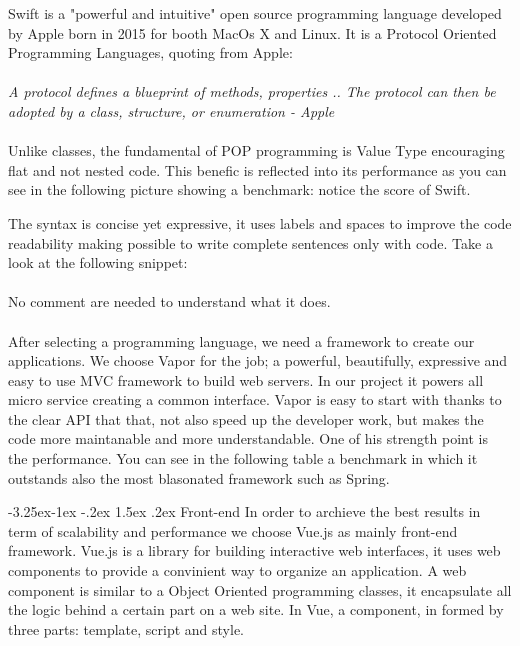 \documentclass[]{usiinfbachelorproject}
\makeatletter
\newcommand\subsubsection{\@startsection{subsubsection}{3}{\z@}%
                {-3.25ex\@plus -1ex \@minus -.2ex}%
                {1.5ex \@plus .2ex}%
                {\normalfont\normalsize\bfseries}}
\makeatother
\begin{document}
Swift is a "powerful and intuitive" open source programming language developed by Apple born in 2015 for booth MacOs X and Linux. It is a Protocol Oriented Programming Languages, quoting from Apple:
\\
\\
\emph{A protocol defines a blueprint of methods, properties .. The protocol can then be adopted by a class, structure, or enumeration - Apple}
\\
\\
Unlike classes, the fundamental of POP programming is Value Type encouraging flat and not nested code. This benefic is reflected into its performance as you can see in the following picture showing a benchmark: notice the score of Swift.

The syntax is concise yet expressive, it uses labels and spaces to improve the code readability making possible to write complete sentences only with code. Take a look at the following snippet:
\\
\\
No comment are needed to understand what it does. 
\\
\\
After selecting a programming language, we need a framework to create our applications. We choose Vapor for the job; a powerful, beautifully, expressive and easy to use MVC framework to build web servers. In our project it powers all micro service creating a common interface. Vapor is easy to start with thanks to the clear API that that, not also speed up the developer work, but makes the code more maintanable and more understandable. One of his strength point is the performance. You can see in the following table a benchmark in which it outstands also the most blasonated framework such as Spring.
\begin{figure}[H]
  \centering
\end{figure} 
\subsubsection{Front-end}
In order to archieve the best results in term of scalability and performance we choose Vue.js as mainly front-end framework. Vue.js is a library for building interactive web interfaces, it uses web components to provide a convinient way to organize an application.
A web component is similar to a Object Oriented programming classes, it encapsulate all the logic behind a certain part on a web site. In Vue, a component, in formed by three parts: template, script and style.
\end{document}
